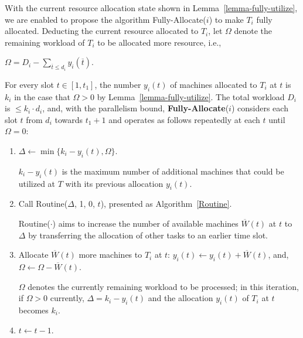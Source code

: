 \documentclass[10pt,journal,compsoc]{IEEEtran}
\begin{document}
With the current resource allocation state shown in Lemma~\ref{lemma-fully-utilize}, we are enabled to propose the algorithm Fully-Allocate($i$) to make $T_{i}$ fully allocated. Deducting the current resource allocated to $T_{i}$, let $\Omega$ denote the remaining workload of $T_{i}$ to be allocated more resource, i.e.,
\begin{center}
$\Omega=D_{i}-\sum_{\overline{t}\leq d_{i}}{y_{i}(\overline{t})}$.
\end{center}
For every slot $t\in[1, t_{1}]$, the number $y_{i}(t)$ of machines allocated to $T_{i}$ at $t$ is $k_{i}$ in the case that $\Omega>0$ by Lemma~\ref{lemma-fully-utilize}. The total workload $D_{i}$ is $\leq k_{i}\cdot d_{i}$, and, with the parallelism bound, \textbf{Fully-Allocate}($i$) considers each slot $t$ from $d_{i}$ towards $t_{1}+1$ and operates as follows repeatedly at each $t$ until $\Omega = 0$:
\begin{enumerate}
 \setlength\itemsep{0.3em}

  \item   $\Delta\leftarrow \min\{k_{i}-y_{i}(t), \Omega\}$.

          \setlength{\parindent}{1em}\vspace{0.15em}{\em Notes.} $k_{i}-y_{i}(t)$ is the maximum number of additional machines that could be utilized at $T$ with its previous allocation $y_{i}(t)$. 

  \item Call Routine($\Delta$, 1, 0, $t$), presented as Algorithm~\ref{Routine}.

        \setlength{\parindent}{1em}\vspace{0.15em}{\em Notes.} Routine($\cdot$) aims to increase the number of available machines $\overline{W}(t)$ at $t$ to $\Delta$ by transferring the allocation of other tasks to an earlier time slot.

  \item Allocate $\overline{W}(t)$ more machines to $T_{i}$ at $t$: $y_{i}(t)\leftarrow y_{i}(t)+\overline{W}(t)$, and, $\Omega\leftarrow \Omega-\overline{W}(t)$.

      \setlength{\parindent}{1em}\vspace{0.15em}{\em Notes.} $\Omega$ denotes the currently remaining workload to be processed; in this iteration, if $\Omega>0$ currently, $\Delta=k_{i}-y_{i}(t)$ and the allocation $y_{i}(t)$ of $T_{i}$ at $t$ becomes $k_{i}$.

  \item $t\leftarrow t-1$.
\end{enumerate}
\end{document}
